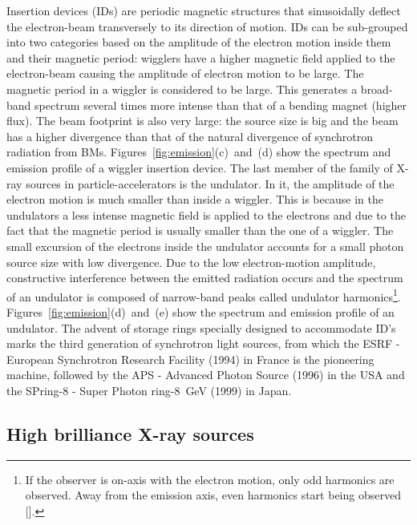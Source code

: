 \begin{refsection}
Insertion devices (IDs) are periodic magnetic structures that sinusoidally deflect the electron-beam transversely to its direction of motion. IDs can be sub-grouped into two categories based on the amplitude of the electron motion inside them and their magnetic period: wigglers have a higher magnetic field applied to the electron-beam causing the amplitude of electron motion to be large. The magnetic period in a wiggler is considered to be large. This generates a broad-band spectrum several times more intense than that of a bending magnet (higher flux). The beam footprint is also very large: the source size is big and the beam has a higher divergence than that of the natural divergence of synchrotron radiation from BMs. Figures~\ref{fig:emission}(c)~and~(d) show the spectrum and emission profile of a wiggler insertion device. The last member of the family of X-ray sources in particle-accelerators is the undulator. In it, the amplitude of the electron motion is much smaller than inside a wiggler. This is because in the undulators a less intense magnetic field is applied to the electrons and due to the fact that the magnetic period is usually smaller than the one of a wiggler. The small excursion of the electrons inside the undulator accounts for a small photon source size with low divergence. Due to the low electron-motion amplitude, constructive interference between the emitted radiation occurs and the spectrum of an undulator is composed of narrow-band peaks called undulator harmonics\footnote{If the observer is on-axis with the electron motion, only odd harmonics are observed. Away from the emission axis, even harmonics start being observed [\cite[\textit{§4.2}]{Clarke2004}].}. Figures~\ref{fig:emission}(d)~and~(e) show the spectrum and emission profile of an undulator. The advent of storage rings specially designed to accommodate ID's marks the third generation of synchrotron light sources, from which the ESRF - European Synchrotron Research Facility (1994) in France is the pioneering machine, followed by the APS - Advanced Photon Source (1996) in the USA and the SPring-8 - Super Photon ring-8~GeV (1999) in Japan. 

\subsection{High brilliance X-ray sources}\label{sec:brilliance}


\end{refsection}

